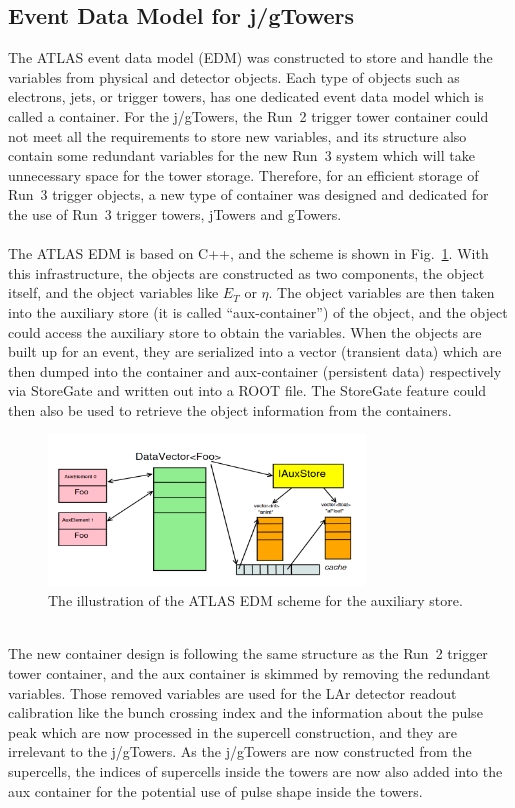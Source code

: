 \subsection{Event Data Model for j/gTowers}
The ATLAS event data model\cite{Buckley:2015tjh} (EDM) was constructed to store and handle the variables from physical and detector objects. Each type of objects such as electrons, jets, or trigger towers, has one dedicated event data model which is called a container. For the j/gTowers, the Run~2 trigger tower container could not meet all the requirements to store new variables, and its structure also contain some redundant variables for the new Run~3 system which will take unnecessary space for the tower storage. Therefore, for an efficient storage of Run~3 trigger objects, a new type of container was designed and dedicated for the use of Run~3 trigger towers, jTowers and gTowers. 
\\
\\The ATLAS EDM is based on C++, and the scheme is shown in Fig.~\ref{Fig:edm}. With this infrastructure, the objects are constructed as two components, the object itself, and the object variables like $E_{T}$ or $\eta$. The object variables are then taken into the auxiliary store (it is called ``aux-container'') of the object, and the object could access the auxiliary store to obtain the variables. When the objects are built up for an event, they are serialized into a vector (transient data) which are then dumped into the container and aux-container (persistent data) respectively via StoreGate\cite{Calafiura:2003gf} and written out into a ROOT file. The StoreGate feature could then also be used to retrieve the object information from the containers.
\begin{figure}[!h]                
	\includegraphics[width=0.75\textwidth]{Chapter6/EDM.png}
	\begin{center}
		\caption{The illustration of the ATLAS EDM scheme for the auxiliary store\cite{Buckley:2015tjh}.}
		\label{Fig:edm}            
	\end{center}
\end{figure}
\noindent
\\The new container design is following the same structure as the Run~2 trigger tower container, and the aux container is skimmed by removing the redundant variables. Those removed variables are used for the LAr detector readout calibration like the bunch crossing index and the information about the pulse peak which are now processed in the supercell construction, and they are irrelevant to the j/gTowers. As the j/gTowers are now constructed from the supercells, the indices of supercells inside the towers are now also added into the aux container for the potential use of pulse shape inside the towers. 
